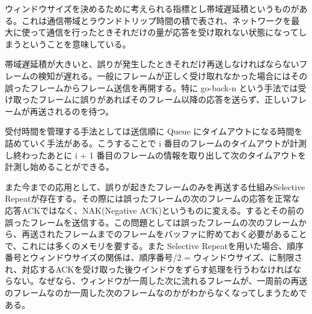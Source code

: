 \documentclass[a4paper, dvipdfmx, 10pt]{article}
\begin{document}
ウィンドウサイズを決めるために考えられる指標とし帯域遅延積というものがある。これは通信帯域とラウンドトリップ時間の積で表され、ネットワークを最大に使って通信を行ったときそれだけの量が応答を受け取れない状態になってしまうということを意味している。\par
帯域遅延積が大きいと、誤りが発生したときそれだけ再送しなければならないフレームの検知が遅れる。一般にフレームが正しく受け取れなかった場合にはその誤ったフレームからフレーム送信を再開する。特に go-back-n という手法では受け取ったフレームに誤りがあればそのフレーム以降の応答を送らず、正しいフレームが再送されるのを待つ。\par
受付時間を管理する手法としては送信順に Queue にタイムアウトになる時間を詰めていく手法がある。こうすることで i 番目のフレームのタイムアウトが計測し終わったあとに i + 1 番目のフレームの情報を取り出して次のタイムアウトを計測し始めることができる。\par
また今までの応用として、誤りが起きたフレームのみを再送する仕組みSelective Repeatが存在する。その際には誤ったフレームの次のフレームの応答を正常な応答ACKではなく、NAK(Negative ACK)というものに変える。するとその前の誤ったフレームを送信する。この問題としては誤ったフレームの次のフレームから、再送されたフレームまでのフレームをバッファに貯めておく必要があることで、これには多くのメモリを要する。また Selective Repeatを用いた場合、順序番号とウィンドウサイズの関係は、順序番号/2 = ウィンドウサイズ、に制限され、対応するACKを受け取った後ウインドウをずらす処理を行うわなければならない。なぜなら、ウィンドウが一周した次に流れるフレームが、一周前の再送のフレームなのか一周した次のフレームなのかがわからなくなってしまうためである。\par
\end{document}
